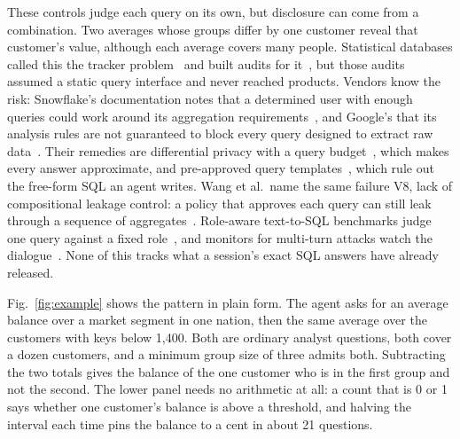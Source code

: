 \documentclass[sigconf,nonacm]{acmart}
\begin{document}
These controls judge each query on its own, but disclosure can come from a combination. Two averages whose groups differ by one customer reveal that customer's value, although each average covers many people. Statistical databases called this the tracker problem~\cite{denning1979tracker} and built audits for it~\cite{chin1982auditing,kenthapadi2005simulatable}, but those audits assumed a static query interface and never reached products. Vendors know the risk: Snowflake's documentation notes that a determined user with enough queries could work around its aggregation requirements~\cite{snowflakeagg}, and Google's that its analysis rules are not guaranteed to block every query designed to extract raw data~\cite{bigquerycleanrooms}. Their remedies are differential privacy with a query budget~\cite{snowflakedp,bigqueryrules,awsdp}, which makes every answer approximate, and pre-approved query templates~\cite{bigquerycleanrooms}, which rule out the free-form SQL an agent writes. Wang et al.\ name the same failure V8, lack of compositional leakage control: a policy that approves each query can still leak through a sequence of aggregates~\cite{dataagents2026}. Role-aware text-to-SQL benchmarks judge one query against a fixed role~\cite{jiang2026rbacsql,klisura2025schema}, and monitors for multi-turn attacks watch the dialogue~\cite{chen2025sequential}. None of this tracks what a session's exact SQL answers have already released.

Fig.~\ref{fig:example} shows the pattern in plain form. The agent asks for an average balance over a market segment in one nation, then the same average over the customers with keys below 1,400. Both are ordinary analyst questions, both cover a dozen customers, and a minimum group size of three admits both. Subtracting the two totals gives the balance of the one customer who is in the first group and not the second. The lower panel needs no arithmetic at all: a count that is 0 or 1 says whether one customer's balance is above a threshold, and halving the interval each time pins the balance to a cent in about 21 questions.
\end{document}
